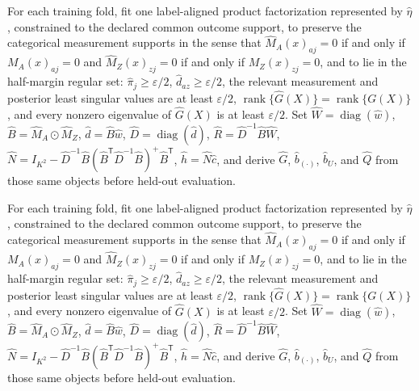 For each training fold, fit one label-aligned product factorization represented by \(\widehat\eta\), constrained to the declared common outcome support, to preserve the categorical measurement supports in the sense that \(\widehat M_A(x)_{aj}=0\) if and only if \(M_A(x)_{aj}=0\) and \(\widehat M_Z(x)_{zj}=0\) if and only if \(M_Z(x)_{zj}=0\), and to lie in the half-margin regular set: \(\widehat\pi_j\geq\varepsilon/2\), \(\widehat d_{az}\geq\varepsilon/2\), the relevant measurement and posterior least singular values are at least \(\varepsilon/2\), \(\operatorname{rank}\{\widehat G(X)\}=\operatorname{rank}\{G(X)\}\), and every nonzero eigenvalue of \(\widehat G(X)\) is at least \(\varepsilon/2\).  Set \(\widehat W=\operatorname{diag}(\widehat w)\), \(\widehat B=\widehat M_A\odot\widehat M_Z\), \(\widehat d=\widehat B\widehat w\), \(\widehat D=\operatorname{diag}(\widehat d)\), \(\widehat R=\widehat D^{-1}\widehat B\widehat W\), \(\widehat N=I_{K^2}-\widehat D^{-1}\widehat B(\widehat B^{\mathsf T}\widehat D^{-1}\widehat B)^+\widehat B^{\mathsf T}\), \(\widehat h=\widehat N\widehat c\), and derive \(\widehat G\), \(\widehat b_{(\cdot)}\), \(\widehat b_U\), and \(\widehat Q\) from those same objects before held-out evaluation.

For each training fold, fit one label-aligned product factorization represented by \(\widehat\eta\), constrained to the declared common outcome support, to preserve the categorical measurement supports in the sense that \(\widehat M_A(x)_{aj}=0\) if and only if \(M_A(x)_{aj}=0\) and \(\widehat M_Z(x)_{zj}=0\) if and only if \(M_Z(x)_{zj}=0\), and to lie in the half-margin regular set: \(\widehat\pi_j\geq\varepsilon/2\), \(\widehat d_{az}\geq\varepsilon/2\), the relevant measurement and posterior least singular values are at least \(\varepsilon/2\), \(\operatorname{rank}\{\widehat G(X)\}=\operatorname{rank}\{G(X)\}\), and every nonzero eigenvalue of \(\widehat G(X)\) is at least \(\varepsilon/2\).  Set \(\widehat W=\operatorname{diag}(\widehat w)\), \(\widehat B=\widehat M_A\odot\widehat M_Z\), \(\widehat d=\widehat B\widehat w\), \(\widehat D=\operatorname{diag}(\widehat d)\), \(\widehat R=\widehat D^{-1}\widehat B\widehat W\), \(\widehat N=I_{K^2}-\widehat D^{-1}\widehat B(\widehat B^{\mathsf T}\widehat D^{-1}\widehat B)^+\widehat B^{\mathsf T}\), \(\widehat h=\widehat N\widehat c\), and derive \(\widehat G\), \(\widehat b_{(\cdot)}\), \(\widehat b_U\), and \(\widehat Q\) from those same objects before held-out evaluation.

